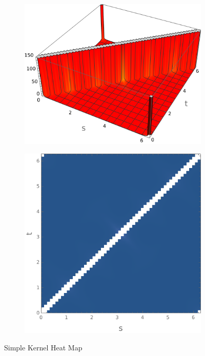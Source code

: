 \documentclass{beamer}
\theoremstyle{remark}
\begin{document}
\begin{frame}
    \begin{figure}[h]
        \centering
        \begin{subfigure}[b]{0.45\textwidth}
            \centering
            \includegraphics[width=\textwidth]{simpleKHeatMap1.png}
        \end{subfigure}
        \begin{subfigure}[b]{0.45\textwidth}
            \centering
            \includegraphics[width=\textwidth]{simpleKHeatMap2.png}
        \end{subfigure}
        \caption{Simple Kernel Heat Map}
    \end{figure}
\end{frame}
\end{document}
